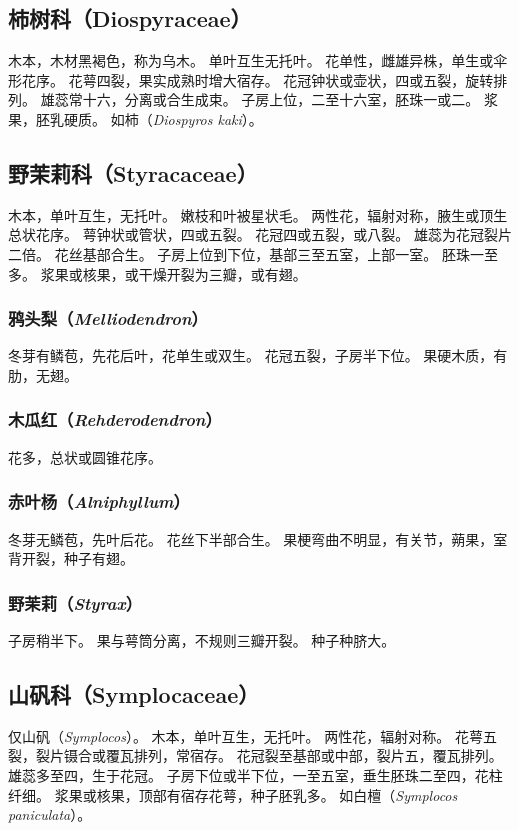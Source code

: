 \documentclass[11pt]{article}
\begin{document}
\begin{sloppypar}
\subsection{柿树科（Diospyraceae）}
木本，木材黑褐色，称为乌木。
单叶互生无托叶。
花单性，雌雄异株，单生或伞形花序。
花萼四裂，果实成熟时增大宿存。
花冠钟状或壶状，四或五裂，旋转排列。
雄蕊常十六，分离或合生成束。
子房上位，二至十六室，胚珠一或二。
浆果，胚乳硬质。
如柿（\textit{Diospyros kaki}）。

\subsection{野茉莉科（Styracaceae）}
木本，单叶互生，无托叶。
嫩枝和叶被星状毛。
两性花，辐射对称，腋生或顶生总状花序。
萼钟状或管状，四或五裂。
花冠四或五裂，或八裂。
雄蕊为花冠裂片二倍。
花丝基部合生。
子房上位到下位，基部三至五室，上部一室。
胚珠一至多。
浆果或核果，或干燥开裂为三瓣，或有翅。

\subsubsection{鸦头梨（\textit{Melliodendron}）}
冬芽有鳞苞，先花后叶，花单生或双生。
花冠五裂，子房半下位。
果硬木质，有肋，无翅。

\subsubsection{木瓜红（\textit{Rehderodendron}）}
花多，总状或圆锥花序。

\subsubsection{赤叶杨（\textit{Alniphyllum}）}
冬芽无鳞苞，先叶后花。
花丝下半部合生。
果梗弯曲不明显，有关节，蒴果，室背开裂，种子有翅。

\subsubsection{野茉莉（\textit{Styrax}）}
子房稍半下。
果与萼筒分离，不规则三瓣开裂。
种子种脐大。

\subsection{山矾科（Symplocaceae）}
仅山矾（\textit{Symplocos}）。
木本，单叶互生，无托叶。
两性花，辐射对称。
花萼五裂，裂片镊合或覆瓦排列，常宿存。
花冠裂至基部或中部，裂片五，覆瓦排列。
雄蕊多至四，生于花冠。
子房下位或半下位，一至五室，垂生胚珠二至四，花柱纤细。
浆果或核果，顶部有宿存花萼，种子胚乳多。
如白檀（\textit{Symplocos paniculata}）。


\end{sloppypar}
\end{document}
